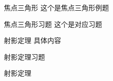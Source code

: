 \begin{example}{焦点三角形}
这个是焦点三角形例题
\end{example}%
\begin{exercise}{焦点三角形习题}
这个是对应习题
\end{exercise}
\begin{example}{射影定理}
具体内容
\end{example}
\begin{exercise}{射影定理习题}

\end{exercise}
\begin{exercise}{射影定理}

\end{exercise}

